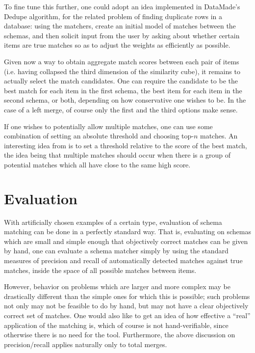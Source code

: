 \documentclass{article}
\theoremstyle{definition}
\theoremstyle{remark}
\begin{document}
To fine tune this further, one could adopt an idea implemented in DataMade's Dedupe algorithm, for the related problem of finding duplicate rows in a database: using the matchers, create an initial model of matches between the schemas, and then solicit input from the user by asking about whether certain items are true matches so as to adjust the weights as efficiently as possible.

Given now a way to obtain aggregate match scores between each pair of items (i.e. having collapsed the third dimension of the similarity cube), it remains to actually select the match candidates. One can require the candidate to be the best match for each item in the first schema, the best item for each item in the second schema, or both, depending on how conservative one wishes to be. In the case of a left merge, of course only the first and the third options make sense.

If one wishes to potentially allow multiple matches, one can use some combination of setting an absolute threshold and choosing top-$n$ matches. An interesting idea from \cite{coma} is to set a threshold relative to the score of the best match, the idea being that multiple matches should occur when there is a group of potential matches which all have close to the same high score.

\section{Evaluation}

With artificially chosen examples of a certain type, evaluation of schema matching can be done in a perfectly standard way. That is, evaluating on schemas which are small and simple enough that objectively correct matches can be given by hand, one can evaluate a schema matcher simply by using the standard measures of precision and recall of automatically detected matches against true matches, inside the space of all possible matches between items.

However, behavior on problems which are larger and more complex may be drastically different than the simple ones for which this is possible; such problems not only may not be feasible to do by hand, but may not have a clear objectively correct set of matches. One would also like to get an idea of how effective a ``real'' application of the matching is, which of course is not hand-verifiable, since otherwise there is no need for the tool. Furthermore, the above discussion on precision/recall applies naturally only to total merges.
\end{document}
